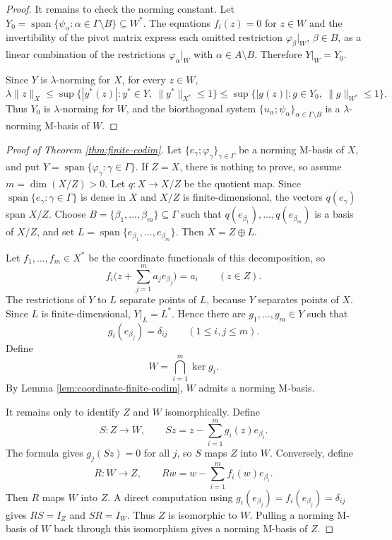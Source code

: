 \documentclass[11pt]{article}
\newcommand{\X}{X}
\newcommand{\Z}{Z}
\newcommand{\spn}{\operatorname{span}}
\begin{document}
\begin{proof}
It remains to check the norming constant. Let
$Y_0=\spn\{\psi_\alpha:\alpha\in\Gamma\setminus B\}\subseteq W^*$.
The equations $f_i(z)=0$ for $z\in W$ and the invertibility of the pivot
matrix express each omitted restriction $\varphi_\beta|_W$, $\beta\in B$,
as a linear combination of the restrictions
$\varphi_\alpha|_W$ with $\alpha\in A\setminus B$. Therefore
$Y|_W=Y_0$.

Since $Y$ is $\lambda$-norming for $\X$, for every $z\in W$,
\[
 \lambda\|z\|_\X
 \le
 \sup\{ |y^*(z)|: y^*\in Y,\ \|y^*\|_{\X^*}\le 1\}
 \le
 \sup\{ |g(z)|: g\in Y_0,\ \|g\|_{W^*}\le 1\}.
\]
Thus $Y_0$ is $\lambda$-norming for $W$, and the biorthogonal system
$\{u_\alpha;\psi_\alpha\}_{\alpha\in\Gamma\setminus B}$ is a
$\lambda$-norming M-basis of $W$.
\end{proof}

\begin{proof}[Proof of Theorem \ref{thm:finite-codim}]
Let $\{e_\gamma;\varphi_\gamma\}_{\gamma\in\Gamma}$ be a norming M-basis of
$\X$, and put $Y=\spn\{\varphi_\gamma:\gamma\in\Gamma\}$. If $\Z=\X$, there is
nothing to prove, so assume $m=\dim(\X/\Z)>0$. Let $q:\X\to \X/\Z$ be the
quotient map. Since $\spn\{e_\gamma:\gamma\in\Gamma\}$ is dense in $\X$ and
$\X/\Z$ is finite-dimensional, the vectors $q(e_\gamma)$ span $\X/\Z$.
Choose $B=\{\beta_1,\ldots,\beta_m\}\subseteq\Gamma$ such that
$q(e_{\beta_1}),\ldots,q(e_{\beta_m})$ is a basis of $\X/\Z$, and set
$L=\spn\{e_{\beta_1},\ldots,e_{\beta_m}\}$. Then $\X=\Z\oplus L$.

Let $f_1,\ldots,f_m\in \X^*$ be the coordinate functionals of this
decomposition, so
\[
    f_i\Big(z+\sum_{j=1}^m a_j e_{\beta_j}\Big)=a_i
    \qquad (z\in\Z).
\]
The restrictions of $Y$ to $L$ separate points of $L$, because $Y$ separates
points of $\X$. Since $L$ is finite-dimensional, $Y|_L=L^*$. Hence there are
$g_1,\ldots,g_m\in Y$ such that
\[
    g_i(e_{\beta_j})=\delta_{ij}\qquad (1\le i,j\le m).
\]
Define
\[
    W=\bigcap_{i=1}^m\ker g_i .
\]
By Lemma \ref{lem:coordinate-finite-codim}, $W$ admits a norming M-basis.

It remains only to identify $\Z$ and $W$ isomorphically. Define
\[
    S:\Z\to W,\qquad
    Sz=z-\sum_{i=1}^m g_i(z)e_{\beta_i}.
\]
The formula gives $g_j(Sz)=0$ for all $j$, so $S$ maps $\Z$ into $W$.
Conversely, define
\[
    R:W\to\Z,\qquad
    Rw=w-\sum_{i=1}^m f_i(w)e_{\beta_i}.
\]
Then $R$ maps $W$ into $\Z$. A direct computation using
$g_i(e_{\beta_j})=f_i(e_{\beta_j})=\delta_{ij}$ gives $RS=I_\Z$ and
$SR=I_W$. Thus $\Z$ is isomorphic to $W$. Pulling a norming M-basis of $W$
back through this isomorphism gives a norming M-basis of $\Z$.
\end{proof}
\end{document}
